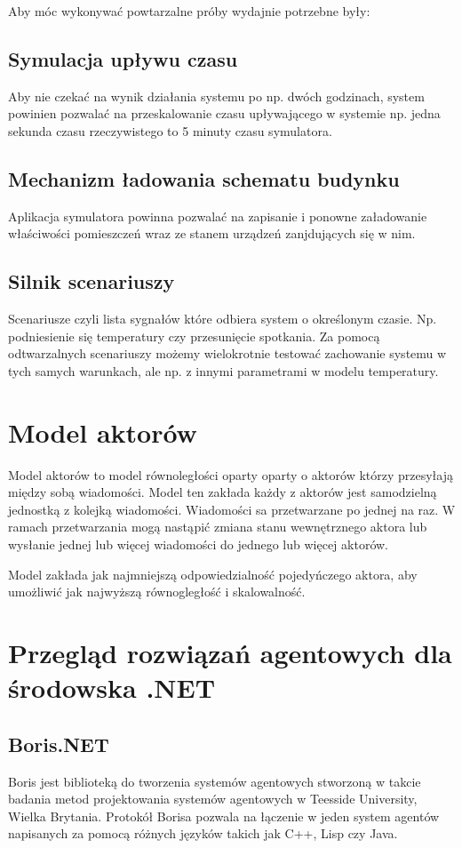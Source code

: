 Aby móc wykonywać powtarzalne próby wydajnie potrzebne były:

\subsection*{Symulacja upływu czasu}
Aby nie czekać na wynik działania systemu po np. dwóch godzinach, system powinien pozwalać na przeskalowanie czasu upływającego w systemie np. jedna sekunda czasu rzeczywistego to 5 minuty czasu symulatora.

\subsection*{Mechanizm ładowania schematu budynku}
Aplikacja symulatora powinna pozwalać na zapisanie i ponowne załadowanie właściwości pomieszczeń wraz ze stanem urządzeń zanjdujących się w nim.

\subsection*{Silnik scenariuszy}
Scenariusze czyli lista sygnałów które odbiera system o określonym czasie. Np. podniesienie się temperatury czy przesunięcie spotkania. Za pomocą odtwarzalnych scenariuszy możemy wielokrotnie testować zachowanie systemu w tych samych warunkach, ale np. z innymi parametrami w modelu temperatury.

\section{Model aktorów}
Model aktorów to model równoległości oparty oparty o aktorów którzy przesyłają między sobą wiadomości.
Model ten zakłada każdy z aktorów jest samodzielną jednostką z kolejką wiadomości. Wiadomości sa przetwarzane po jednej na raz. W ramach przetwarzania mogą nastąpić zmiana stanu wewnętrznego aktora lub wysłanie jednej lub więcej wiadomości do jednego lub więcej aktorów. 

Model zakłada jak najmniejszą odpowiedzialność pojedyńczego aktora, aby umożliwić jak najwyższą równogległość i skalowalność.

\section{Przegląd rozwiązań agentowych dla środowska .NET}
\subsection{Boris.NET}
Boris jest biblioteką do tworzenia systemów agentowych stworzoną w takcie badania metod projektowania systemów agentowych w Teesside University, Wielka Brytania. Protokół Borisa pozwala na łączenie w jeden system agentów napisanych za pomocą różnych języków takich jak C++, Lisp czy Java. 


